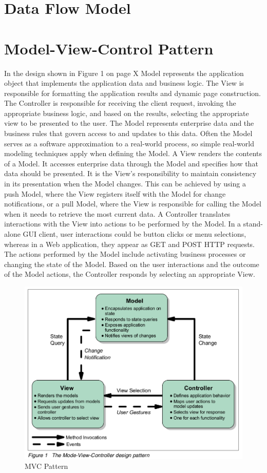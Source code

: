 \section{Data Flow Model}
\section{Model-View-Control Pattern}
In the design shown in Figure 1 on page X Model represents the application
object that implements the application data and business logic. The View is
responsible for formatting the application results and dynamic page construction.
The Controller is responsible for receiving the client request, invoking the
appropriate business logic, and based on the results, selecting the appropriate
view to be presented to the user.
The Model represents enterprise data and the business rules that govern
access to and updates to this data. Often the Model serves as a software
approximation to a real-world process, so simple real-world modeling
techniques apply when defining the Model.
A View renders the contents of a Model. It accesses enterprise data through
the Model and specifies how that data should be presented.
It is the View's responsibility to maintain consistency in its presentation when
the Model changes. This can be achieved by using a push Model, where the
View registers itself with the Model for change notifications, or a pull Model,
where the View is responsible for calling the Model when it needs to retrieve
the most current data.
A Controller translates interactions with the View into actions to be performed
by the Model. In a stand-alone GUI client, user interactions could be button
clicks or menu selections, whereas in a Web application, they appear as GET
and POST HTTP requests. The actions performed by the Model include
activating business processes or changing the state of the Model. Based on
the user interactions and the outcome of the Model actions, the Controller
responds by selecting an appropriate View.
\begin{figure}[!ht]
\centering
\includegraphics[scale=0.5]{images/MVCPattern.png}   
\caption[MVC Pattern]{MVC Pattern}
\label{img:MVCPattern}                           
\end{figure}
